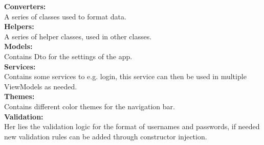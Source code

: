\textbf{Converters:}\\ 
A series of classes used to format data. 
\\
\textbf{Helpers: }\\
A series of helper classes, used in other classes. 
\\
\textbf{Models:}\\
Contains \gls{Dto} for the settings of the app.
\\
\textbf{Services:}\\
Contains some services to e.g.  login, this service can then be used in multiple ViewModels as needed.
\\
\textbf{Themes:}\\
Contains different color themes for the navigation bar.
\\
\textbf{Validation:}\\
Her lies the validation logic for the format of usernames and passwords, if needed new validation rules can be added through constructor injection.